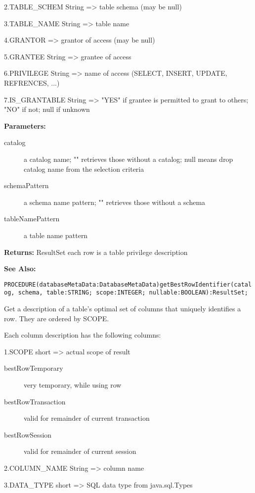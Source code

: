 2.TABLE\_SCHEM String => table schema (may be null) 

3.TABLE\_NAME String => table name 

4.GRANTOR => grantor of access (may be null) 

5.GRANTEE String => grantee of access 

6.PRIVILEGE String => name of access (SELECT, INSERT, UPDATE, REFRENCES, ...) 

7.IS\_GRANTABLE String => "YES" if grantee is permitted to grant to others; "NO" if not; null if unknown 


{\bf Parameters: }
\begin{description}
\item[catalog] a catalog name; "" retrieves those without a catalog; null means drop catalog name from the selection criteria 
\item[schemaPattern] a schema name pattern; "" retrieves those without a schema 
\item[tableNamePattern] a table name pattern 
\end{description}

{\bf Returns: } 
ResultSet each row is a table privilege description 

{\bf See Also:} 




\verb'PROCEDURE(databaseMetaData:DatabaseMetaData)getBestRowIdentifier(catalog, schema, table:STRING; scope:INTEGER; nullable:BOOLEAN):ResultSet;'





Get a description of a table's optimal set of columns that uniquely identifies a row. They are ordered by SCOPE. 

Each column description has the following columns: 

1.SCOPE short => actual scope of result 
\begin{description}
\item[bestRowTemporary] very temporary, while using row 
\item[bestRowTransaction] valid for remainder of current transaction 
\item[bestRowSession] valid for remainder of current session 
\end{description}

2.COLUMN\_NAME String => column name 

3.DATA\_TYPE short => SQL data type from java.sql.Types 

